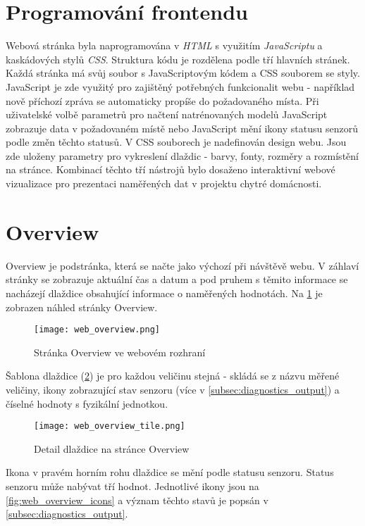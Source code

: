 \section{Programování frontendu} \label{sec:frontend}
Webová stránka byla naprogramována v \textit{HTML} s využitím \textit{JavaScriptu} a kaskádových stylů \textit{CSS}. Struktura kódu je rozdělena podle tří hlavních stránek. Každá stránka má svůj soubor s JavaScriptovým kódem a CSS souborem se styly. JavaScript je zde využitý pro zajištěný potřebných funkcionalit webu - například nově příchozí zpráva se automaticky propíše do požadovaného místa. Při uživatelské volbě parametrů pro načtení natrénovaných modelů JavaScript zobrazuje data v požadovaném místě nebo JavaScript mění ikony statusu senzorů podle změn těchto statusů. V CSS souborech je nadefinován design webu. Jsou zde uloženy parametry pro vykreslení dlaždic - barvy, fonty, rozměry a rozmístění na stránce. Kombinací těchto tří nástrojů bylo dosaženo interaktivní webové vizualizace pro prezentaci naměřených dat v projektu chytré domácnosti.

\section{Overview} \label{sec:overview}

Overview je podstránka, která se načte jako výchozí při návštěvě webu. V záhlaví stránky se zobrazuje aktuální čas a datum a pod pruhem s těmito informace se nacházejí dlaždice obsahující informace o naměřených hodnotách. Na \cref{fig:web_overview} je zobrazen náhled stránky Overview. 

\begin{figure}[H]
  \centering
  \texttt{[image: web\_overview.png]}
  \caption{Stránka Overview ve webovém rozhraní}
  \label{fig:web_overview}
\end{figure}  

Šablona dlaždice (\cref{fig:web_overview_tile}) je pro každou veličinu stejná - skládá se z názvu měřené veličiny, ikony zobrazující stav senzoru (více v \cref{subsec:diagnostics_output}) a číselné hodnoty s fyzikální jednotkou.

\begin{figure}[H]
  \centering
  \texttt{[image: web\_overview\_tile.png]}
  \caption{Detail dlaždice na stránce Overview}
  \label{fig:web_overview_tile}
\end{figure}

Ikona v pravém horním rohu dlaždice se mění podle statusu senzoru. Status senzoru může nabývat tří hodnot. Jednotlivé ikony jsou na \cref{fig:web_overview_icons} a význam těchto stavů je popsán v \cref{subsec:diagnostics_output}. 

